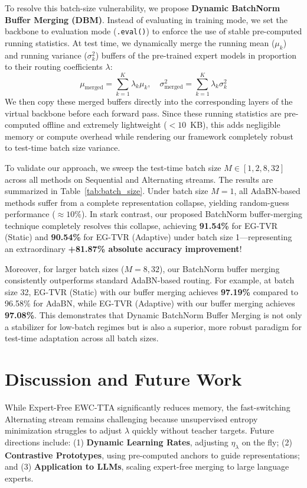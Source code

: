 \documentclass{article}
\theoremstyle{plain}
\theoremstyle{definition}
\theoremstyle{remark}
\begin{document}
To resolve this batch-size vulnerability, we propose \textbf{Dynamic BatchNorm Buffer Merging (DBM)}. Instead of evaluating in training mode, we set the backbone to evaluation mode (\texttt{.eval()}) to enforce the use of stable pre-computed running statistics. At test time, we dynamically merge the running mean ($\mu_k$) and running variance ($\sigma^2_k$) buffers of the pre-trained expert models in proportion to their routing coefficients $\lambda$:
\begin{equation}
\mu_{\text{merged}} = \sum_{k=1}^K \lambda_k \mu_k, \quad \sigma^2_{\text{merged}} = \sum_{k=1}^K \lambda_k \sigma^2_k
\end{equation}
We then copy these merged buffers directly into the corresponding layers of the virtual backbone before each forward pass. Since these running statistics are pre-computed offline and extremely lightweight ($<10$~KB), this adds negligible memory or compute overhead while rendering our framework completely robust to test-time batch size variance.

To validate our approach, we sweep the test-time batch size $M \in [1, 2, 8, 32]$ across all methods on Sequential and Alternating streams. The results are summarized in Table~\ref{tab:batch_size}. Under batch size $M=1$, all AdaBN-based methods suffer from a complete representation collapse, yielding random-guess performance ($\approx 10\%$). In stark contrast, our proposed BatchNorm buffer-merging technique completely resolves this collapse, achieving \textbf{91.54\%} for EG-TVR (Static) and \textbf{90.54\%} for EG-TVR (Adaptive) under batch size 1---representing an extraordinary \textbf{+81.87\% absolute accuracy improvement}!

Moreover, for larger batch sizes ($M=8, 32$), our BatchNorm buffer merging consistently outperforms standard AdaBN-based routing. For example, at batch size 32, EG-TVR (Static) with our buffer merging achieves \textbf{97.19\%} compared to 96.58\% for AdaBN, while EG-TVR (Adaptive) with our buffer merging achieves \textbf{97.08\%}. This demonstrates that Dynamic BatchNorm Buffer Merging is not only a stabilizer for low-batch regimes but is also a superior, more robust paradigm for test-time adaptation across all batch sizes.

\section{Discussion and Future Work}
\label{sec:discussion}
While Expert-Free EWC-TTA significantly reduces memory, the fast-switching Alternating stream remains challenging because unsupervised entropy minimization struggles to adjust $\lambda$ quickly without teacher targets. Future directions include: (1) \textbf{Dynamic Learning Rates}, adjusting $\eta_{\lambda}$ on the fly; (2) \textbf{Contrastive Prototypes}, using pre-computed anchors to guide representations; and (3) \textbf{Application to LLMs}, scaling expert-free merging to large language experts.
\end{document}
